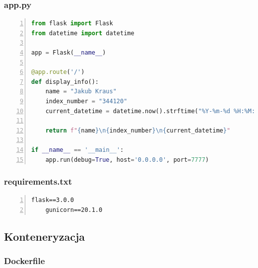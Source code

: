 \documentclass[a4paper,12pt]{article}
\begin{document}
\subsubsection{app.py}

\begin{lstlisting}[breaklines=true, basicstyle=\small, numbers=left, language=Python]
from flask import Flask
from datetime import datetime

app = Flask(__name__)

@app.route('/')
def display_info():
    name = "Jakub Kraus"
    index_number = "344120"
    current_datetime = datetime.now().strftime("%Y-%m-%d %H:%M:%S")

    return f"{name}\n{index_number}\n{current_datetime}"

if __name__ == '__main__':
    app.run(debug=True, host='0.0.0.0', port=7777)

\end{lstlisting}
\subsubsection{requirements.txt}
\begin{lstlisting}[breaklines=true, basicstyle=\small, numbers=left]
    flask==3.0.0
    gunicorn==20.1.0
\end{lstlisting}
\begin{figure}

\end{figure}
\newpage

\subsection{Konteneryzacja\cite{noauthor_docker_2024}}
\subsubsection{Dockerfile}
\end{document}
